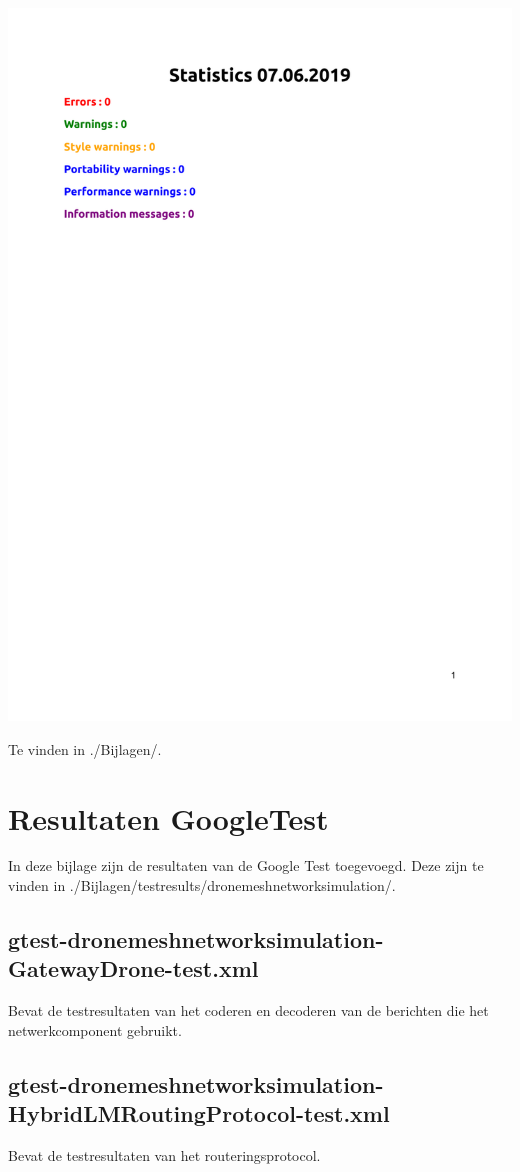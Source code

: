 \documentclass[a4paper, 11pt, oneside]{report}
\begin{document}
\begin{center}\includegraphics[page=1,width=.8\linewidth]{Bijlagen/cppcheck-gui.pdf}\end{center}
Te vinden in ./Bijlagen/.

\chapter{Resultaten GoogleTest}\label{sec:resultaten-googletest}
In deze bijlage zijn de resultaten van de Google Test toegevoegd.
Deze zijn te vinden in ./Bijlagen/test\textunderscore results/drone\textunderscore meshnetwork\textunderscore simulation/.



\section{gtest-drone\textunderscore meshnetwork\textunderscore simulation-GatewayDrone-test.xml}\label{sec:gtest-dronemeshnetworksimulation-gatewaydrone-testxml}
Bevat de testresultaten van het coderen en decoderen van de berichten die het netwerkcomponent gebruikt.

\section{gtest-drone\textunderscore meshnetwork\textunderscore simulation-HybridLMRoutingProtocol-test.xml}\label{sec:gtest-dronemeshnetworksimulation-hybridlmroutingprotocol-testxml}
Bevat de testresultaten van het routeringsprotocol.
\end{document}
